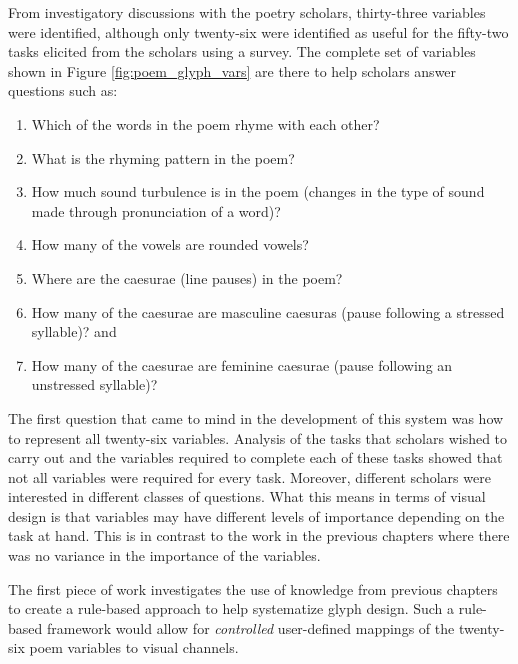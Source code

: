 From investigatory discussions with the poetry scholars, thirty-three variables were identified, although only twenty-six were identified as useful for the fifty-two tasks elicited from the scholars using a survey. 
The complete set of variables shown in Figure \ref{fig:poem_glyph_vars} are there to help scholars answer questions such as:
\begin{enumerate}
\item Which of the words in the poem rhyme with each other?
\vspace{-2mm}
\item What is the rhyming pattern in the poem?
\vspace{-2mm}
\item How much sound turbulence is in the poem (changes in the type of sound made through pronunciation of a word)?
\vspace{-2mm}
\item How many of the vowels are rounded vowels?
\vspace{-2mm}
\item Where are the caesurae (line pauses) in the poem?
\vspace{-2mm}
\item How many of the caesurae are masculine caesuras (pause following a stressed syllable)? and
\vspace{-2mm}
\item How many of the caesurae are feminine caesurae (pause following an unstressed syllable)?
\end{enumerate}

The first question that came to mind in the development of this system was how to represent all twenty-six variables. 
Analysis of the tasks that scholars wished to carry out and the variables required to complete each of these tasks showed that not all variables were required for every task. 
Moreover, different scholars were interested in different classes of questions. 
What this means in terms of visual design is that variables may have different levels of importance depending on the task at hand. 
This is in contrast to the work in the previous chapters where there was no variance in the importance of the variables.

The first piece of work investigates the use of knowledge from previous chapters to create a rule-based approach to help systematize glyph design. 
Such a rule-based framework would allow for \emph{controlled} user-defined mappings of the twenty-six poem variables to visual channels.

